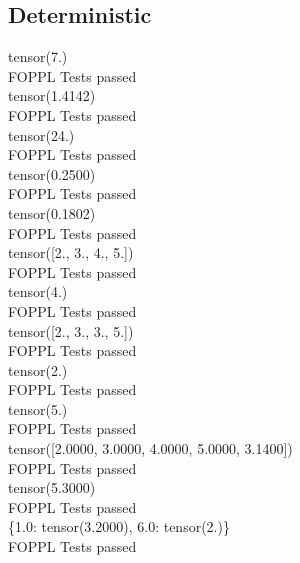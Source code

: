 \documentclass{article}
\begin{document}
\subsection{Deterministic}
tensor(7.)\\
FOPPL Tests passed\\
tensor(1.4142)\\
FOPPL Tests passed\\
tensor(24.)\\
FOPPL Tests passed\\
tensor(0.2500)\\
FOPPL Tests passed\\
tensor(0.1802)\\
FOPPL Tests passed\\
tensor([2., 3., 4., 5.])\\
FOPPL Tests passed\\
tensor(4.)\\
FOPPL Tests passed\\
tensor([2., 3., 3., 5.])\\
FOPPL Tests passed\\
tensor(2.)\\
FOPPL Tests passed\\
tensor(5.)\\
FOPPL Tests passed\\
tensor([2.0000, 3.0000, 4.0000, 5.0000, 3.1400])\\
FOPPL Tests passed\\
tensor(5.3000)\\
FOPPL Tests passed\\
\{1.0: tensor(3.2000), 6.0: tensor(2.)\}\\
FOPPL Tests passed\\
\pagebreak
\end{document}
